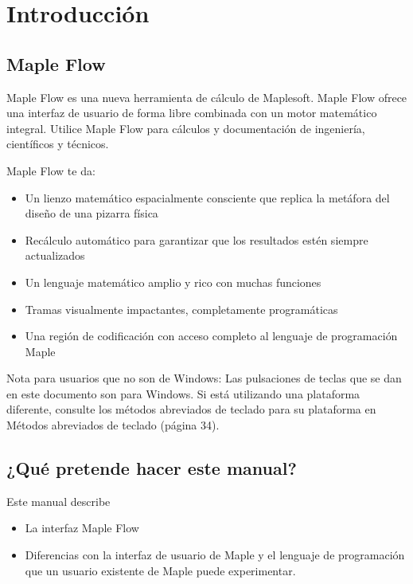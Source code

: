 \section{Introducción}
\subsection{Maple Flow}
Maple Flow es una nueva herramienta de cálculo de Maplesoft. Maple Flow ofrece una interfaz de usuario de forma libre combinada con un motor matemático integral. Utilice Maple Flow para cálculos y documentación de ingeniería, científicos y técnicos.

\newp

Maple Flow te da:

\begin{itemize}
	\item Un lienzo matemático espacialmente consciente que replica la metáfora del diseño de una pizarra física
	
	\item Recálculo automático para garantizar que los resultados estén siempre actualizados
	
	\item Un lenguaje matemático amplio y rico con muchas funciones
	
	\item Tramas visualmente impactantes, completamente programáticas
	
	\item Una región de codificación con acceso completo al lenguaje de programación Maple
	
\end{itemize}

Nota para usuarios que no son de Windows: Las pulsaciones de teclas que se dan en este documento son para Windows. Si está utilizando una plataforma diferente, consulte los métodos abreviados de teclado para su plataforma en Métodos abreviados de teclado (página 34).

\subsection{¿Qué pretende hacer este manual?}
Este manual describe

\begin{itemize}
  \item La interfaz Maple Flow
  
  \item Diferencias con la interfaz de usuario de Maple y el lenguaje de programación que un usuario existente de Maple puede experimentar.

\end{itemize}

